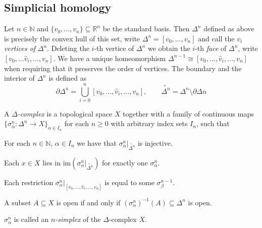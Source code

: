 \documentclass[11pt]{book}
\numberwithin{dummy}{section}
\theoremstyle{nonumberbreak}
\newenvironment{defin}[1][]{\ifthenelse{\equal{#1}{}}{\definition}{\definition[#1]}\rm}{\enddefinition}
\newcommand{\la}{\longrightarrow}
\begin{document}
\begin{spacing}{1.4}
\section{Simplicial homology} %



Let $n \in \mathbb{N}$ and $\{v_0, \ldots, v_n\} \subseteq \mathbb{R}^n$ be the standard basis. Then $\Delta^n$ defined as above is precisely the convex hull of this set, write $\Delta^n=[v_0, \ldots, v_n]$ and call the $v_i$ \textit{vertices of} $\Delta^n$. Deleting the $i$-th vertice of $\Delta^n$ we obtain the $i$-th \textit{face} of $\Delta^n$, write $[v_0, \ldots \hat{v}_i, \ldots, v_n]$. We have a unique homeomorphism $\Delta^{n-1} \cong [v_0, \ldots, \hat{v}_i, \ldots, v_n]$ when requiring that it preserves the order of vertices. The boundary and the interior of $\Delta^n$ is defined as 
$$\partial \Delta^n = \bigcup_{i=0}^n [v_0, \ldots, \hat{v}_i, \ldots, v_n], \qquad \overset{\circ \ \ }{\Delta ^n} = \Delta^{n} \setminus \partial \Delta{n}$$




\begin{defin}
A $\Delta$\textit{-complex} is a topological space $X$ together with a family of continuous maps $\{ \sigma_{\alpha}^n: \Delta^n \la X \}_{\alpha \in I_n}$ for each $n \geqslant 0$ with arbitrary index sets $I_n$, such that
\begin{compactenum}
\item For each $n \in \mathbb{N}$, $\alpha \in I_n$ we have that $\sigma_{\alpha}^n \vert_{\overset{\circ \ \ }{\Delta^n}}$ is injective.
\item Each $x \in X$ lies in $\mathrm{im}\left( \sigma_{\alpha}^n \vert_{\overset{\circ\ \ }{\Delta^n}} \right)$ for exactly one $\sigma_{\alpha}^n$.
\item Each restriction $\sigma_{\alpha}^n \vert_{[v_0, \ldots, \hat{v}_i, \ldots, v_n]}$ is equal to some $\sigma_{\beta}^{n-1}$.
\item A subset $A\subseteq X$ is open if and only if $\left(\sigma_{\alpha}^n\right)^{-1}(A) \subseteq \Delta^{n}$ is open.

\end{compactenum}
$\sigma_{\alpha}^n$ is called an $n$\textit{-simplex} of the $\Delta$-complex $X$.


\end{defin}
\end{spacing}
\end{document}
